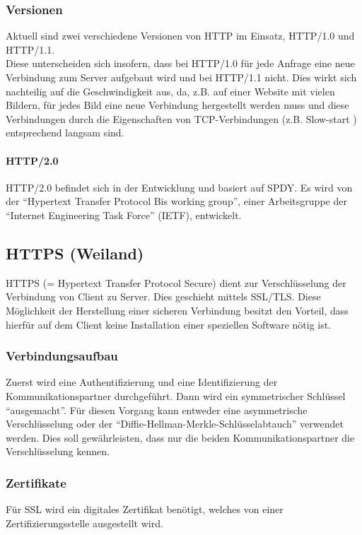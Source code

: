 \subsubsection{Versionen}
Aktuell sind zwei verschiedene Versionen von HTTP im Einsatz, HTTP/1.0 und HTTP/1.1.
\\
Diese unterscheiden sich insofern, dass bei HTTP/1.0 für jede Anfrage eine neue Verbindung zum Server aufgebaut wird und bei HTTP/1.1 nicht. Dies wirkt sich nachteilig auf die Geschwindigkeit aus, da, z.B. auf einer Website mit vielen Bildern, für jedes Bild eine neue Verbindung hergestellt werden muss und diese Verbindungen durch die Eigenschaften von TCP-Verbindungen (z.B. Slow-start ) entsprechend langsam sind.

\paragraph{HTTP/2.0}  HTTP/2.0 befindet sich in der Entwicklung und basiert auf SPDY. Es wird von der \enquote{Hypertext Transfer Protocol Bis working group}, einer Arbeitsgruppe der \enquote{Internet Engineering Task Force} (IETF), entwickelt.

\subsection{HTTPS (Weiland)}
HTTPS (= Hypertext Transfer Protocol Secure) dient zur Verschlüsselung der Verbindung von Client zu Server. Dies geschieht mittels SSL/TLS. Diese Möglichkeit der Herstellung einer sicheren Verbindung besitzt den Vorteil, dass hierfür auf dem Client keine Installation einer speziellen Software nötig ist.
\subsubsection{Verbindungsaufbau}
Zuerst wird eine Authentifizierung und eine Identifizierung der Kommunikationspartner durchgeführt. Dann wird ein symmetrischer Schlüssel \enquote{ausgemacht}. Für diesen Vorgang kann entweder eine asymmetrische Verschlüsselung oder der \enquote{Diffie-Hellman-Merkle-Schlüsselabtauch} verwendet werden. Dies soll gewährleisten, dass nur die beiden Kommunikationspartner die Verschlüsselung kennen.
\subsubsection{Zertifikate}
Für SSL wird ein digitales Zertifikat benötigt, welches von einer Zertifizierungsstelle ausgestellt wird.
